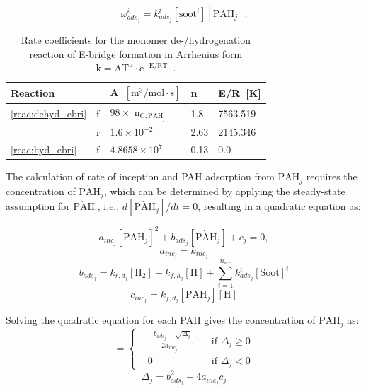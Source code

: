 \begin{equation}
	\omega^i_{ads_j} = k^i_{ads_{j}} [\mathrm{soot}^i] [\mathrm{\dot{PAH}}_j].
\end{equation}



\renewcommand{\arraystretch}{1.5}
\begin{table}
	\caption{Rate coefficients for the monomer de-/hydrogenation reaction of E-bridge formation in Arrhenius form $\mathrm{k=AT^n\cdot e^{-E/RT}}$~\citep{frenklach2020mechanism}.}
	\label{tab:Ebridge}
	\centering
	\begin{tabular}{l l l l l}
		\hline
		Reaction & \hspace{0.1cm} & A~$\mathrm{\left[{m^3}/{mol\cdot s} \right]}$ & n & {E}/{R}~[K]  \\
		\hline
		\eqref{reac:dehyd_ebri} & f & $98\times$ $\mathrm{n_{C, PAH_j}}$ & 1.8 & 7563.519 \\
		& r & $1.6\times 10^{-2}$ & 2.63 & 2145.346\\
		\eqref{reac:hyd_ebri} & f & $4.8658\times10^7
		$ & 0.13 & 0.0\\
		\hline
	\end{tabular}
\end{table}



The calculation of rate of inception and PAH adsorption from $\mathrm{PAH}_j$ requires the concentration of $\mathrm{\dot{PAH}}_j$, which can be determined by applying the steady-state assumption for $\mathrm{\dot{PAH}_j}$, i.e., $d[\mathrm{\dot{PAH}}_j]/dt=0$, resulting in a quadratic equation as:


\begin{equation}
	a_{inc_j}[\mathrm{\dot{PAH}}_j]^2+
	b_{ads_j}[\mathrm{\dot{PAH}}_j] + c_j = 0,
\end{equation}
\begin{equation}
	a_{inc_j}=k_{inc_j}
\end{equation}
\begin{equation}
	b_{ads_j}=k_{r,d_j}[\mathrm{H_2}]+k_{f,h_j}[\mathrm{H}]+\sum_{i=1}^{n_{sec}}k^i_{ads_j}[\mathrm{Soot}]^i
\end{equation}
\begin{equation}
	c_{inc_j}=k_{f,d_j}[\mathrm{PAH}_j][\mathrm{H}]
\end{equation}

Solving the quadratic equation for each PAH gives the concentration of $\mathrm{\mathrm{\dot{PAH}}}_j$ as:
\begin{equation}
	[\mathrm{\mathrm{\dot{PAH}}}_j]=
	\left\{
	\begin{aligned}
		&\frac{-b_{ads_j}+\sqrt{\Delta_j}}{2a_{inc_j}},
		&&
		\text{if } \Delta_j \ge 0
		\\
		& 0 
		&&
		\text{if } \Delta_j < 0
	\end{aligned}
	\right.
	\label{eqn:rad_ebri}
\end{equation}
\begin{equation}
	\Delta_j = b_{ads_j}^2-4a_{inc_j}c_{j}
	\label{eqn:delta_ebri}
\end{equation}

